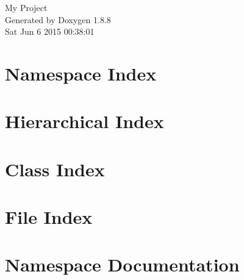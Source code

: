 \documentclass[twoside]{book}
\newcommand{\+}{\discretionary{\mbox{\scriptsize$\hookleftarrow$}}{}{}}
\newcommand{\clearemptydoublepage}{%
  \newpage{\pagestyle{empty}\cleardoublepage}%
}
\begin{document}
\hypersetup{pageanchor=false,
             bookmarks=true,
             bookmarksnumbered=true,
             pdfencoding=unicode
            }
\begin{titlepage}
\vspace*{7cm}
\begin{center}%
{\Large My Project }\\
\vspace*{1cm}
{\large Generated by Doxygen 1.8.8}\\
\vspace*{0.5cm}
{\small Sat Jun 6 2015 00:38:01}\\
\end{center}
\end{titlepage}
\clearemptydoublepage
\tableofcontents
\clearemptydoublepage
{}
\hypersetup{pageanchor=true}

\chapter{Namespace Index}

\chapter{Hierarchical Index}

\chapter{Class Index}

\chapter{File Index}

\chapter{Namespace Documentation}







\end{document}
